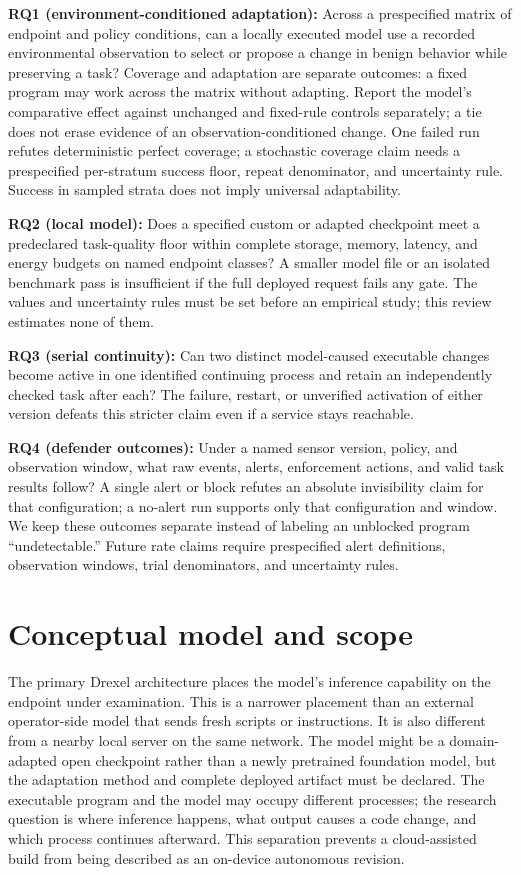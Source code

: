 \documentclass[11pt,letterpaper]{article}
\begin{document}
\textbf{RQ1 (environment-conditioned adaptation):} Across a prespecified matrix of endpoint and policy conditions, can a locally executed model use a recorded environmental observation to select or propose a change in benign behavior while preserving a task? Coverage and adaptation are separate outcomes: a fixed program may work across the matrix without adapting. Report the model's comparative effect against unchanged and fixed-rule controls separately; a tie does not erase evidence of an observation-conditioned change. One failed run refutes deterministic perfect coverage; a stochastic coverage claim needs a prespecified per-stratum success floor, repeat denominator, and uncertainty rule. Success in sampled strata does not imply universal adaptability.

\textbf{RQ2 (local model):} Does a specified custom or adapted checkpoint meet a predeclared task-quality floor within complete storage, memory, latency, and energy budgets on named endpoint classes? A smaller model file or an isolated benchmark pass is insufficient if the full deployed request fails any gate. The values and uncertainty rules must be set before an empirical study; this review estimates none of them.

\textbf{RQ3 (serial continuity):} Can two distinct model-caused executable changes become active in one identified continuing process and retain an independently checked task after each? The failure, restart, or unverified activation of either version defeats this stricter claim even if a service stays reachable.

\textbf{RQ4 (defender outcomes):} Under a named sensor version, policy, and observation window, what raw events, alerts, enforcement actions, and valid task results follow? A single alert or block refutes an absolute invisibility claim for that configuration; a no-alert run supports only that configuration and window. We keep these outcomes separate instead of labeling an unblocked program ``undetectable.'' Future rate claims require prespecified alert definitions, observation windows, trial denominators, and uncertainty rules.

\section{Conceptual model and scope}\label{sec:model}

The primary Drexel architecture places the model's inference capability on the endpoint under examination. This is a narrower placement than an external operator-side model that sends fresh scripts or instructions. It is also different from a nearby local server on the same network. The model might be a domain-adapted open checkpoint rather than a newly pretrained foundation model, but the adaptation method and complete deployed artifact must be declared. The executable program and the model may occupy different processes; the research question is where inference happens, what output causes a code change, and which process continues afterward. This separation prevents a cloud-assisted build from being described as an on-device autonomous revision.
\end{document}
